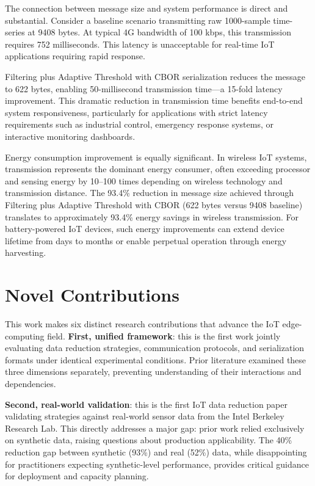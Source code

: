 \documentclass[10pt,twocolumn]{article}
\begin{document}
The connection between message size and system performance is direct and substantial. Consider a baseline scenario transmitting raw 1000-sample time-series at 9408 bytes. At typical 4G bandwidth of 100 kbps, this transmission requires 752 milliseconds. This latency is unacceptable for real-time IoT applications requiring rapid response.

Filtering plus Adaptive Threshold with CBOR serialization reduces the message to 622 bytes, enabling 50-millisecond transmission time---a 15-fold latency improvement. This dramatic reduction in transmission time benefits end-to-end system responsiveness, particularly for applications with strict latency requirements such as industrial control, emergency response systems, or interactive monitoring dashboards.

Energy consumption improvement is equally significant. In wireless IoT systems, transmission represents the dominant energy consumer, often exceeding processor and sensing energy by 10--100 times depending on wireless technology and transmission distance. The 93.4\% reduction in message size achieved through Filtering plus Adaptive Threshold with CBOR (622 bytes versus 9408 baseline) translates to approximately 93.4\% energy savings in wireless transmission. For battery-powered IoT devices, such energy improvements can extend device lifetime from days to months or enable perpetual operation through energy harvesting.

\section{Novel Contributions}

This work makes six distinct research contributions that advance the IoT edge-computing field. \textbf{First, unified framework}: this is the first work jointly evaluating data reduction strategies, communication protocols, and serialization formats under identical experimental conditions. Prior literature examined these three dimensions separately, preventing understanding of their interactions and dependencies.

\textbf{Second, real-world validation}: this is the first IoT data reduction paper validating strategies against real-world sensor data from the Intel Berkeley Research Lab. This directly addresses a major gap: prior work relied exclusively on synthetic data, raising questions about production applicability. The 40\% reduction gap between synthetic (93\%) and real (52\%) data, while disappointing for practitioners expecting synthetic-level performance, provides critical guidance for deployment and capacity planning.
\end{document}
